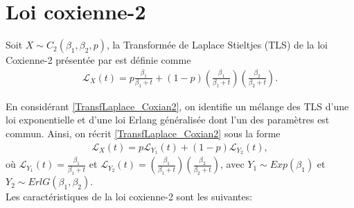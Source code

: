 \section{Loi coxienne-2}\label{Annexe_Cox2}
\begin{Definition}
Soit $X \sim C_2(\beta_1,\beta_2,p)$, la Transformée de Laplace Stieltjes (TLS) de la loi Coxienne-2 présentée par \cite{LossModels_FurtherTopics_Klugman2013} est définie comme
\begin{align}
\mathcal{L}_X(t) = p \frac{\beta_1}{\beta_1+t} + (1-p) \left( \frac{\beta_1}{\beta_1+t} \right) \left( \frac{\beta_2}{\beta_2+t} \right) \label{TransfLaplace_Coxian2}.
\end{align}
\end{Definition}
En considérant \ref{TransfLaplace_Coxian2}, on identifie un mélange des TLS d'une loi exponentielle et d'une loi Erlang généralisée dont l'un des paramètres est commun. Ainsi, on récrit \ref{TransfLaplace_Coxian2} sous la forme
\begin{align}
	\mathcal{L}_X(t) = p \mathcal{L}_{Y_1}(t) + (1-p) \mathcal{L}_{Y_2}(t), \label{TransfLaplace_Coxian2_2}
\end{align}
où $\mathcal{L}_{Y_1}(t) = \frac{\beta_1}{\beta_1+t}$ et $\mathcal{L}_{Y_2}(t) = \left(\frac{\beta_1}{\beta_1+t}\right) \left(\frac{\beta_2}{\beta_2+t}\right)$, avec $Y_1 \sim Exp(\beta_1)$ et $Y_2 \sim ErlG(\beta_1,\beta_2)$.\\

Les caractéristiques de la loi coxienne-2 sont les suivantes:\\

